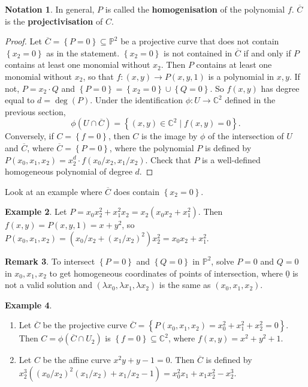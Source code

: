 \documentclass{article}
\newcommand{\C}{\mathbb{C}}
\renewcommand{\P}{\mathbb{P}}
\newcommand{\rb}[1]{\left( #1 \right)}
\newcommand{\cb}[1]{\left\{ #1 \right\}}
\theoremstyle{definition}\newtheorem{definition}{Definition}[section]
\theoremstyle{definition}\newtheorem{notation}[definition]{Notation}
\theoremstyle{definition}\newtheorem{remark}[definition]{Remark}
\theoremstyle{definition}\newtheorem{example}[definition]{Example}
\theoremstyle{definition}\newtheorem{fact}{Fact}
\theoremstyle{definition}\newtheorem{exercise}{Exercise}
\begin{document}
\begin{notation}
In general, $ P $ is called the \textbf{homogenisation} of the polynomial $ f $. $ \overline{C} $ is the \textbf{projectivisation} of $ C $.
\end{notation}

\begin{proof}
Let $ \overline{C} = \cb{P = 0} \subseteq \P^2 $ be a projective curve that does not contain $ \cb{x_2 = 0} $ as in the statement. $ \cb{x_2 = 0} $ is not contained in $ \overline{C} $ if and only if $ P $ contains at least one monomial without $ x_2 $. Then $ P $ contains at least one monomial without $ x_2 $, so that $ f : \rb{x, y} \to P\rb{x, y, 1} $ is a polynomial in $ x, y $. If not, $ P = x_2 \cdot Q $ and $ \cb{P = 0} = \cb{x_2 = 0} \cup \cb{Q = 0} $. So $ f\rb{x, y} $ has degree equal to $ d = \deg\rb{P} $. Under the identification $ \phi : U \to \C^2 $ defined in the previous section,
$$ \phi\rb{U \cap \overline{C}} = \cb{\rb{x, y} \in \C^2 \mid f\rb{x, y} = 0}. $$
Conversely, if $ C = \cb{f = 0} $, then $ C $ is the image by $ \phi $ of the intersection of $ U $ and $ \overline{C} $, where $ \overline{C} = \cb{P = 0} $, where the polynomial $ P $ is defined by $ P\rb{x_0, x_1, x_2} = x_2^d \cdot f\rb{x_0 / x_2, x_1 / x_2} $. Check that $ P $ is a well-defined homogeneous polynomial of degree $ d $.
\end{proof}

Look at an example where $ \overline{C} $ does contain $ \cb{x_2 = 0} $.

\begin{example}
Let $ P = x_0x_2^2 + x_1^2x_2 = x_2\rb{x_0x_2 + x_1^2} $. Then $ f\rb{x, y} = P\rb{x, y, 1} = x + y^2 $, so $ P\rb{x_0, x_1, x_2} = \rb{x_0 / x_2 + \rb{x_1 / x_2}^2}x_2^2 = x_0x_2 + x_1^2 $.
\end{example}

\begin{remark}
To intersect $ \cb{P = 0} $ and $ \cb{Q = 0} $ in $ \P^2 $, solve $ P = 0 $ and $ Q = 0 $ in $ x_0, x_1, x_2 $ to get homogeneous coordinates of points of intersection, where $ \underline{0} $ is not a valid solution and $ \rb{\lambda x_0, \lambda x_1, \lambda x_2} $ is the same as $ \rb{x_0, x_1, x_2} $.
\end{remark}

\begin{example}
\hfill
\begin{enumerate}
\item Let $ \overline{C} $ be the projective curve $ \overline{C} = \cb{P\rb{x_0, x_1, x_2} = x_0^2 + x_1^2 + x_2^2 = 0} $. Then $ C = \phi\rb{\overline{C} \cap U_2} $ is $ \cb{f = 0} \subseteq \C^2 $, where $ f\rb{x, y} = x^2 + y^2 + 1 $.
\item Let $ C $ be the affine curve $ x^2y + y - 1 = 0 $. Then $ \overline{C} $ is defined by $ x_2^3\rb{\rb{x_0 / x_2}^2\rb{x_1 / x_2} + x_1 / x_2 - 1} = x_0^2x_1 + x_1x_2^2 - x_2^3 $.
\end{enumerate}
\end{example}
\end{document}
